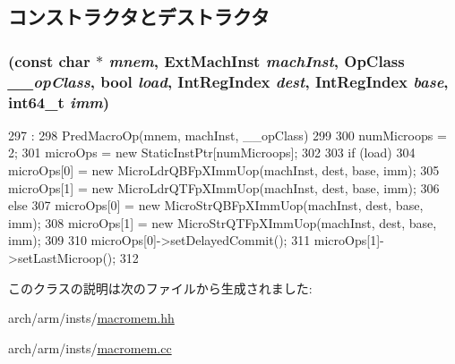 \subsection{コンストラクタとデストラクタ}
\hypertarget{classArmISA_1_1BigFpMemImmOp_a6599205315e3ab3d08dcc63f0d41897a}{
\subsubsection[{BigFpMemImmOp}]{ (const char $\ast$ {\em mnem}, \/  {\bf ExtMachInst} {\em machInst}, \/  OpClass {\em \_\-\_\-opClass}, \/  bool {\em load}, \/  {\bf IntRegIndex} {\em dest}, \/  {\bf IntRegIndex} {\em base}, \/  int64\_\-t {\em imm})}}
\label{classArmISA_1_1BigFpMemImmOp_a6599205315e3ab3d08dcc63f0d41897a}



\begin{DoxyCode}
297                                                             :
298     PredMacroOp(mnem, machInst, __opClass)
299 {
300     numMicroops = 2;
301     microOps = new StaticInstPtr[numMicroops];
302 
303     if (load) {
304         microOps[0] = new MicroLdrQBFpXImmUop(machInst, dest, base, imm);
305         microOps[1] = new MicroLdrQTFpXImmUop(machInst, dest, base, imm);
306     } else {
307         microOps[0] = new MicroStrQBFpXImmUop(machInst, dest, base, imm);
308         microOps[1] = new MicroStrQTFpXImmUop(machInst, dest, base, imm);
309     }
310     microOps[0]->setDelayedCommit();
311     microOps[1]->setLastMicroop();
312 }

\end{DoxyCode}


このクラスの説明は次のファイルから生成されました:\begin{DoxyCompactItemize}
\item 
arch/arm/insts/\hyperlink{macromem_8hh}{macromem.hh}\item 
arch/arm/insts/\hyperlink{macromem_8cc}{macromem.cc}\end{DoxyCompactItemize}
